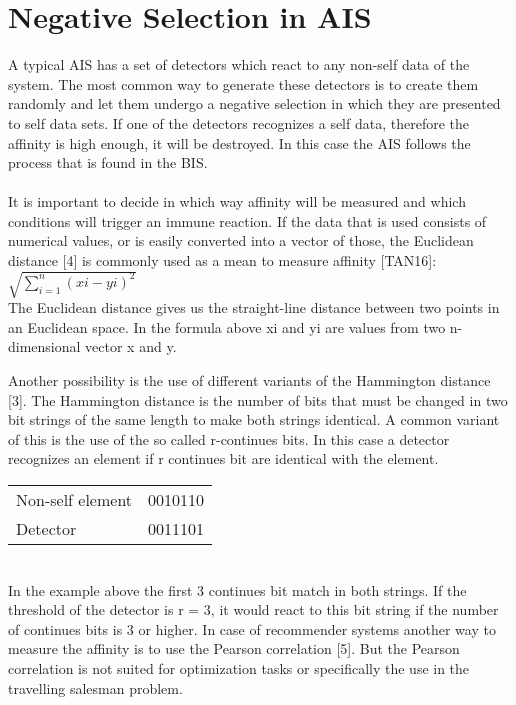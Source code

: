 \section{Negative Selection in AIS}

A typical AIS has a set of detectors which react to any non-self data of the system. The most common way to generate these detectors is to create them randomly and let them undergo a negative selection in which they are presented to self data sets. If one of the detectors recognizes a self data, therefore the affinity is high enough, it will be destroyed. In this case the AIS follows the process that is found in the BIS.\\\\ 
It is important to decide in which way affinity will be measured and which conditions will trigger an immune reaction. If the data that is used consists of numerical values, or is easily converted into a vector of those, the Euclidean distance [4] is commonly used as a mean to measure affinity [TAN16]:\\
\begin{math}
\sqrt{\sum_{i=1}^{n}(xi-yi)^2}
\end{math}\\
The Euclidean distance gives us the straight-line distance between two points in an Euclidean space. In the formula above xi and yi are values from two n-dimensional vector x and y.  

Another possibility is the use of different variants of the Hammington distance [3]. The Hammington distance is the number of bits that must be changed in two bit strings of the same length to make both strings identical. A common variant of this is the use of the so called r-continues bits. In this case a detector recognizes an element if r continues bit are identical with the element.\\
\begin{table*}[htbp]
	\begin{tabular}{ll}
Non-self element & 0010110\\
Detector & 0011101
	\end{tabular}
\end{table*}\\
In the example above the first 3 continues bit match in both strings. If the threshold of the detector is r = 3, it would react to this bit string if the number of continues bits is 3 or higher.
In case of recommender systems another way to measure the affinity is to use the Pearson correlation [5]. But the Pearson correlation is not suited for optimization tasks or specifically the use in the travelling salesman problem. 
